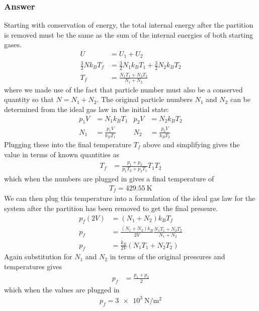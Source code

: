 \subsubsection{Answer}

Starting with conservation of energy, the total internal energy after the
partition is removed must be the same as the sum of the internal energies of
both starting gases.
\begin{align*}
    U &= U_1 + U_2 \\
    \frac 32 Nk_B T_f &= \frac 32 N_1k_B T_1 + \frac 32 N_2k_B T_2 \\
    T_f &= \frac{N_1T_1 + N_2T_2}{N_1 + N_2}
\end{align*}
where we made use of the fact that particle number must also be a conserved
quantity so that $N = N_1 + N_2$. The original particle numbers $N_1$ and $N_2$
can be determined from the ideal gas law in the initial state:
\begin{align*}
    p_1V &= N_1k_B T_1             &   p_2V &= N_2 k_B T_2 \\
    N_1 &= \frac{p_1V}{k_B T_1}    &   N_2 &= \frac{p_2V}{k_B T_2}
\end{align*}
Plugging these into the final temperature $T_f$ above and simplifying gives
the value in terms of known quantities as
\begin{align*}
    T_f &= \frac{p_1 + p_2}{p_1T_2 + p_2T_1} T_1T_2
\end{align*}
which when the numbers are plugged in gives a final temperature of
\begin{align}
    \boxed{ T_f = \SI{429.55}{\K} }
\end{align}
We can then plug this temperature into a formulation of the ideal gas law
for the system after the partition has been removed to get the final pressure.
\begin{align*}
    p_f (2V) &= (N_1+N_2) k_B T_f \\
    p_f &= \frac{(N_1+N_2)k_B}{2V} \frac{N_1T_1 + N_2T_2}{N_1+N_2} \\
    p_f &= \frac{k_B}{2V}(N_1T_1 + N_2T_2)
\end{align*}
Again substitution for $N_1$ and $N_2$ in terms of the original pressures and
temperatures gives
\begin{align*}
    p_f &= \frac{p_1 + p_2}{2}
\end{align*}
which when the values are plugged in
\begin{align}
    \boxed{ p_f = \SI{3e3}{\N\per\m^2} }
\end{align}

